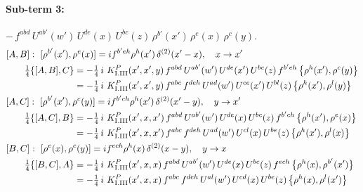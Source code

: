 \documentclass[10pt]{article}
\numberwithin{equation}{section}
\begin{document}
\paragraph{Sub-term 3:} $-\,f^{abd}\,U^{ab'}(w')\,U^{de}(x)\,U^{bc}(z)\,\rho^{b'}(x')\,\rho^{e}(x)\,\rho^{c}(y)$.
\begin{align}
&[A,B]:\ [\rho^{b'}(x'),\rho^{e}(x)]=i f^{b'eh}\rho^{h}(x')\,\delta^{(2)}(x'-x),\quad x\to x'\notag\\
&\qquad \tfrac14\{[A,B],C\}=-\tfrac14\,i\,\,K^{P}_{\rm I.III}(x',x',y)\,f^{abd}\,U^{ab'}(w')\,U^{de}(x')\,U^{bc}(z)\,f^{b'eh}\,\big\{\rho^{h}(x'),\rho^{c}(y)\big\}\notag\\
&\qquad\phantom{\tfrac14\{[A,B],C\}}=-\tfrac14\,i\,\,K^{P}_{\rm I.III}(x',x',y)\,f^{abc}\,f^{deh}\,U^{ad}(w')\,U^{ce}(x')\,U^{bl}(z)\,\big\{\rho^{h}(x'),\rho^{l}(y)\big\}
\label{B:eq:GI.III.P-3-AB}\\
&[A,C]:\ [\rho^{b'}(x'),\rho^{c}(y)]=i f^{b'ch}\rho^{h}(x')\,\delta^{(2)}(x'-y),\quad y\to x'\notag\\
&\qquad \tfrac14\{[A,C],B\}=-\tfrac14\,i\,\,K^{P}_{\rm I.III}(x',x,x')\,f^{abd}\,U^{ab'}(w')\,U^{de}(x)\,U^{bc}(z)\,f^{b'ch}\,\big\{\rho^{h}(x'),\rho^{e}(x)\big\}\notag\\
&\qquad\phantom{\tfrac14\{[A,C],B\}}=-\tfrac14\,i\,\,K^{P}_{\rm I.III}(x',x,x')\,f^{abc}\,f^{deh}\,U^{ad}(w')\,U^{cl}(x)\,U^{be}(z)\,\big\{\rho^{h}(x'),\rho^{l}(x)\big\}
\label{B:eq:GI.III.P-3-AC}\\
&[B,C]:\ [\rho^{e}(x),\rho^{c}(y)]=i f^{ech}\rho^{h}(x)\,\delta^{(2)}(x-y),\quad y\to x\notag\\
&\qquad \tfrac14\{[B,C],A\}=-\tfrac14\,i\,\,K^{P}_{\rm I.III}(x',x,x)\,f^{abd}\,U^{ab'}(w')\,U^{de}(x)\,U^{bc}(z)\,f^{ech}\,\big\{\rho^{h}(x),\rho^{b'}(x')\big\}\notag\\
&\qquad\phantom{\tfrac14\{[B,C],A\}}=-\tfrac14\,i\,\,K^{P}_{\rm I.III}(x',x,x)\,f^{abc}\,f^{deh}\,U^{al}(w')\,U^{cd}(x)\,U^{be}(z)\,\big\{\rho^{h}(x),\rho^{l}(x')\big\}
\label{B:eq:GI.III.P-3-BC}
\end{align}
\end{document}
